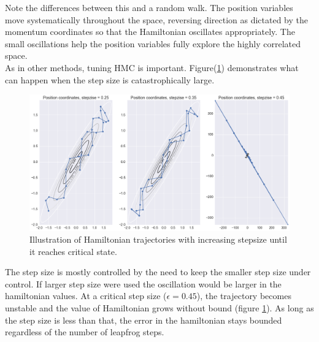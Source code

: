 \documentclass{article}
\numberwithin{equation}{section}
\begin{document}
Note the differences between this and a random walk. The position variables move systematically throughout the space, reversing direction as dictated by the momentum coordinates so that the Hamiltonian oscillates appropriately. The small oscillations help the position variables fully explore the highly correlated space.\\

As in other methods, tuning HMC is important. Figure(\ref{Fig:2}) demonstrates what can happen when the step size is catastrophically large.
\begin{figure}[H]
\centering
  \includegraphics[width=1\linewidth]{HMC_critical_stepsize.png}
  \caption{Illustration of Hamiltonian trajectories with increasing stepsize until it reaches critical state.}
\label{Fig:2}
\end{figure}

The step size is mostly controlled by the need to keep the smaller step size under control. If larger step size were used the oscillation would be larger in the hamiltonian values. At a critical step size ($\epsilon =0.45$), the trajectory becomes unstable and the value of Hamiltonian grows without bound (figure \ref{Fig:2}). As long as the step size is less than that, the error in the hamiltonian stays bounded regardless of the number of leapfrog steps.
\end{document}
